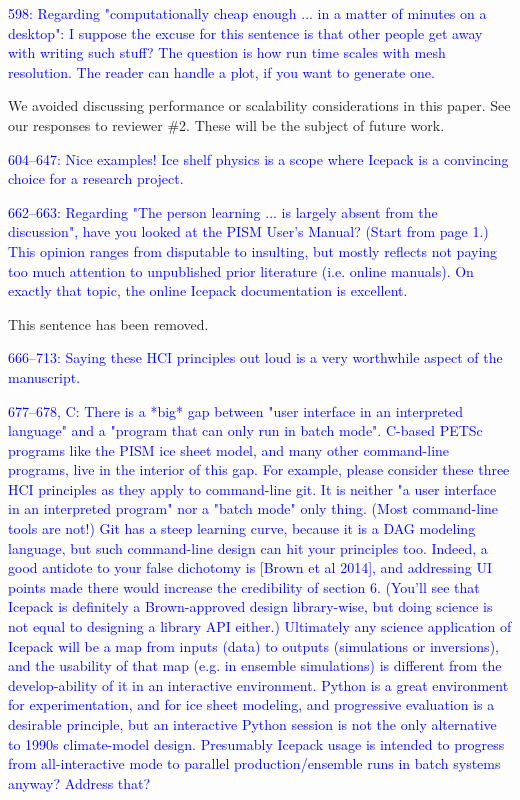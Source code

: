 \documentclass{article}
\theoremstyle{definition}
\theoremstyle{plain}
\begin{document}
\textcolor{blue}{598:  Regarding "computationally cheap enough ... in a matter of minutes on a desktop":  I suppose the excuse for this sentence is that other people get away with writing such stuff?  The question is how run time scales with mesh resolution.  The reader can handle a plot, if you want to generate one.}

We avoided discussing performance or scalability considerations in this paper.
See our responses to reviewer \#2.
These will be the subject of future work.

\textcolor{blue}{604--647:  Nice examples!  Ice shelf physics is a scope where Icepack is a convincing choice for a research project.}

\textcolor{blue}{662--663:  Regarding "The person learning ... is largely absent from the discussion", have you looked at the PISM User's Manual?  (Start from page 1.)  This opinion ranges from disputable to insulting, but mostly reflects not paying too much attention to unpublished prior literature (i.e. online manuals).  On exactly that topic, the online Icepack documentation is excellent.}

This sentence has been removed.

\textcolor{blue}{666--713:  Saying these HCI principles out loud is a very worthwhile aspect of the manuscript.}

\textcolor{blue}{677--678, C:  There is a *big* gap between "user interface in an interpreted language" and a "program that can only run in batch mode".  C-based PETSc programs like the PISM ice sheet model, and many other command-line programs, live in the interior of this gap.  For example, please consider these three HCI principles as they apply to command-line git.  It is neither "a user interface in an interpreted program" nor a "batch mode" only thing.  (Most command-line tools are not!)  Git has a steep learning curve, because it is a DAG modeling language, but such command-line design can hit your principles too.  Indeed, a good antidote to your false dichotomy is [Brown et al 2014], and addressing UI points made there would increase the credibility of section 6.  (You'll see that Icepack is definitely a Brown-approved design library-wise, but doing science is not equal to designing a library API either.)  Ultimately any science application of Icepack will be a map from inputs (data) to outputs (simulations or inversions), and the usability of that map (e.g. in ensemble simulations) is different from the develop-ability of it in an interactive environment.  Python is a great environment for experimentation, and for ice sheet modeling, and progressive evaluation is a desirable principle, but an interactive Python session is not the only alternative to 1990s climate-model design.  Presumably Icepack usage is intended to progress from all-interactive mode to parallel production/ensemble runs in batch systems anyway?  Address that?}
\end{document}
